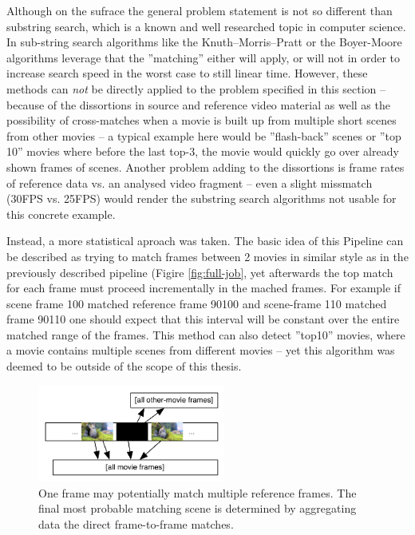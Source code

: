 Although on the sufrace the general problem statement is not so different than substring search, which is a known and well researched topic in computer science. In sub-string search algorithms like the Knuth–Morris–Pratt \cite{kmp-string-search} or the Boyer-Moore \cite{boyer-string-search} algorithms leverage that the ''matching'' either will apply, or will not in order to increase search speed in the worst case to still linear time. However, these methods can \textit{not} be directly applied to the problem specified in this section -- because of the dissortions in source and reference video material as well as the possibility of cross-matches when a movie is built up from multiple short scenes from other movies -- a typical example here would be ''flash-back'' scenes or ''top 10'' movies where before the last top-3, the movie would quickly go over already shown frames of scenes. Another problem adding to the dissortions is frame rates of reference data vs. an analysed video fragment -- even a slight missmatch (30FPS vs. 25FPS) would render the substring search algorithms not usable for this concrete example.

Instead, a more statistical aproach was taken. The basic idea of this Pipeline can be described as trying to match frames between 2 movies in similar style as in the previously described pipeline (Figire \ref{fig:full-job}, yet afterwards the top match for each frame must proceed incrementally in the mached frames. For example if scene frame 100 matched reference frame 90100 and scene-frame 110 matched frame 90110 one should expect that this interval will be constant over the entire matched range of the frames. This method can also detect ''top10'' movies, where a movie contains multiple scenes from different movies -- yet this algorithm was deemed to be outside of the scope of this thesis.


\begin{figure}[ch!]
  \centering
  \includegraphics[width=0.55\textwidth]{img/frames-timeline-matching-missmatch}
  \caption{One frame may potentially match multiple reference frames. The final most probable matching scene is determined by aggregating data the direct frame-to-frame matches.}
\end{figure}


